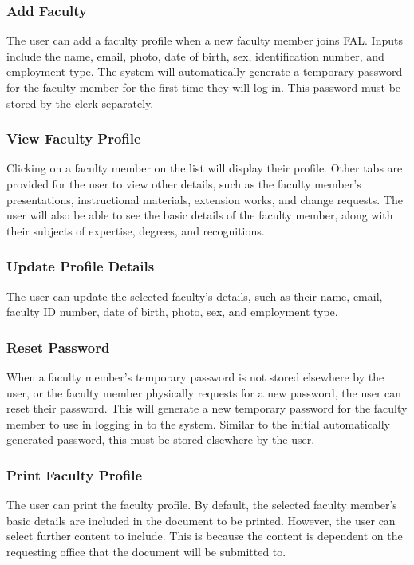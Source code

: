     	\subsubsection{Add Faculty}
    	The user can add a faculty profile when a new faculty member joins FAL. Inputs include the name, email, photo, date of birth, sex, identification number, and employment type. The system will automatically generate a temporary password for the faculty member for the first time they will log in. This password must be stored by the clerk separately.
    	
    	\subsubsection{View Faculty Profile}
    	Clicking on a faculty member on the list will display their profile. Other tabs are provided for the user to view other details, such as the faculty member's presentations, instructional materials, extension works, and change requests. The user will also be able to see the basic details of the faculty member, along with their subjects of expertise, degrees, and recognitions.
    	
    	\subsubsection{Update Profile Details}
    	The user can update the selected faculty's details, such as their name, email, faculty ID number, date of birth, photo, sex, and employment type.
    	
    	\subsubsection{Reset Password}
    	When a faculty member's temporary password is not stored elsewhere by the user, or the faculty member physically requests for a new password, the user can reset their password. This will generate a new temporary password for the faculty member to use in logging in to the system. Similar to the initial automatically generated password, this must be stored elsewhere by the user.
    	
    	\subsubsection{Print Faculty Profile}
    	The user can print the faculty profile. By default, the selected faculty member's basic details are included in the document to be printed. However, the user can select further content to include. This is because the content is dependent on the requesting office that the document will be submitted to.
    	
